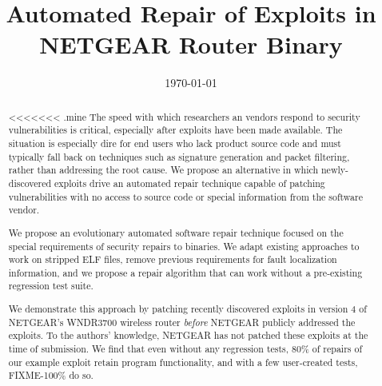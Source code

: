 \documentclass{sigcomm-alternate}
\date{\today}
\title{Automated Repair of Exploits in NETGEAR Router Binary}
\begin{document}
\maketitle
\usetikzlibrary{arrows,decorations,decorations.pathreplacing,shapes}

\begin{abstract}
<<<<<<< .mine
The speed with which researchers an vendors respond to security
vulnerabilities is critical, especially after exploits have been made
available. The situation is especially dire for end users who lack
product source code and must typically fall back on techniques such as
signature generation and packet filtering, rather than addressing the root
cause. We propose an alternative in which newly-discovered exploits drive
an automated repair technique capable of patching vulnerabilities with no
access to source code or special information from the software vendor.

We propose an evolutionary automated software repair technique focused on
the special requirements of security repairs to binaries.  We adapt 
existing approaches to work on stripped ELF files, remove previous 
requirements for fault localization information, and we propose a
repair algorithm that can work without a pre-existing regression test
suite. 

We demonstrate this approach by patching recently discovered exploits
in version 4 of NETGEAR's WNDR3700 wireless router \emph{before} NETGEAR
publicly addressed the exploits. To the authors' knowledge, NETGEAR has not
patched these exploits at the time of submission. We find that even without
any regression tests, 80\% of repairs of our example exploit retain program
functionality, and with a few user-created tests, FIXME-100\% do so. 

\end{abstract}
\end{document}
